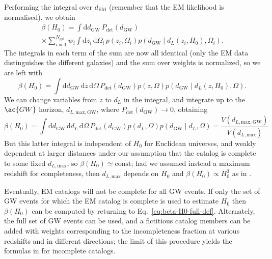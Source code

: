 \documentclass[modern]{aastex62}
\newcommand{\dd}{\mathrm{d}}
\newcommand{\dEM}{d_{\mathrm{EM}}}
\newcommand{\dGW}{d_{\mathrm{GW}}}
\newcommand{\Ngal}{N_{\mathrm{gal}}}
\newcommand{\Pdet}{P_{\mathrm{det}}}
\begin{document}
Performing the integral over $\dEM$ (remember that the \ac{EM} likelihood is
normalised), we obtain
%
\begin{multline}
    \beta\left( H_0 \right) =  \int \dd \dGW \, \Pdet\left( \dGW \right) \\ \times \sum_{i=1}^{\Ngal} w_i \int \dd z_i \, \dd \Omega_i \, p\left( z_i, \Omega_i \right) p\left( \dGW \mid d_L\left( z_i, H_0 \right), \Omega_i \right).
\end{multline}
%
The integrals in each term of the sum are now all identical (only the \ac{EM}
data distinguishes the different galaxies) and the sum over weights is
normalized, so we are left with
%
\begin{equation}
     \beta\left( H_0 \right) =  \int \dd \dGW \, \dd z \, \dd \Omega \, \Pdet\left( \dGW \right)  p\left( z, \Omega \right) p\left( \dGW \mid d_L\left( z, H_0 \right), \Omega \right).
\end{equation}
%
We can change variables from $z$ to $d_L$ in the integral, and integrate up to
the $\ac{GW}$ horizon, $d_{L,\mathrm{max},\mathrm{GW}}$, where $\Pdet\left( \dGW
\right) \to 0$, obtaining
%
\begin{equation}
    \beta\left( H_0 \right) =  \int \dd \dGW \, \dd d_L \, \dd \Omega \, \Pdet\left( \dGW \right)  p\left( d_L, \Omega \right) p\left( \dGW \mid d_L, \Omega \right) = \frac{V \left( d_{L,\mathrm{max},\mathrm{GW}} \right)}{V\left( d_{L,\mathrm{max}} \right)}
\end{equation}
%
But this latter integral is independent of $H_0$ for Euclidean universes, and
weakly dependent at larger distances under our assumption that the catalog is
complete to some fixed $d_{L, \mathrm{max}}$, so $\beta\left( H_0 \right) \simeq
\mathrm{const}$; had we assumed instead a maximum redshift for completeness,
then $d_{L, \mathrm{max}}$ depends on $H_0$ and $\beta\left( H_0 \right) \propto
H_0^3$ as in \citet{Fishbach2018}.

Eventually, \ac{EM} catalogs will not be complete for all \ac{GW} events.  If
only the set of \ac{GW} events for which the \ac{EM} catalog is complete is used
to estimate $H_0$ then $\beta\left( H_0 \right)$ can be computed by returning to
Eq.\ \eqref{eq:beta-H0-full-def}.  Alternately, the full set of \ac{GW} events
can be used, and a fictitious catalog members can be added with weights
corresponding to the incompleteness fraction at various redshifts and in
different directions; the limit of this procedure yields the formulas in
\citet{Fishbach2018} for incomplete catalogs.
\end{document}
